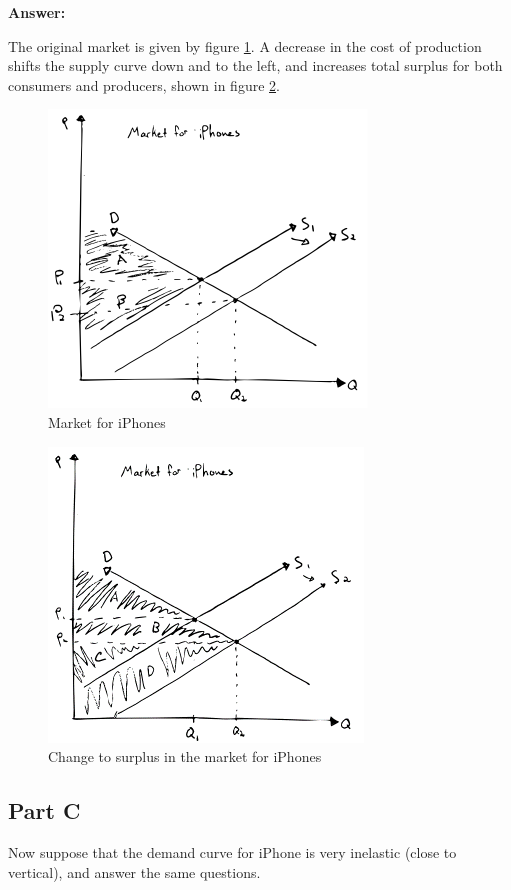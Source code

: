 \documentclass[12pt]{article}
\begin{document}
\vspace{2mm}

\textbf{Answer:}

\vspace{2mm}

The original market is given by figure \ref{fig:iphone1}. A decrease in the cost of production shifts the supply curve down and to the left, and increases total surplus for both consumers and producers, shown in figure \ref{fig:iphone2}.

\begin{figure}
    \centering
    \includegraphics[width=.5\textwidth]{../../figs/iphone1.png}
    \caption{Market for iPhones}
    \label{fig:iphone1}
\end{figure}

\begin{figure}
    \centering
    \includegraphics[width=.5\textwidth]{../../figs/iphone2.png}
    \caption{Change to surplus in the market for iPhones}
    \label{fig:iphone2}
\end{figure}

\subsection*{Part C}

Now suppose that the demand curve for iPhone is very inelastic (close to vertical), and answer the same questions.
\end{document}
